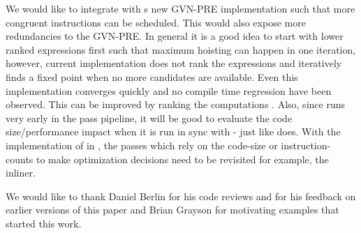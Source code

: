\documentclass[sigplan,10pt,review,anonymous]{acmart}\settopmatter{printfolios=true,printccs=false,printacmref=false}
\begin{document}
We would like to integrate \GCM{} with s new GVN-PRE implementation such
that more congruent instructions can be scheduled. This would also expose more
redundancies to the GVN-PRE. In general it is a good idea to start with lower
ranked expressions first such that maximum hoisting can happen in one iteration,
however, current implementation does not rank the expressions and iteratively
finds a fixed point when no more candidates are available. Even this
implementation converges quickly and no compile time regression have been
observed. This can be improved by ranking the computations
\cite{rosen1988global}. Also, since \GCM{} runs very early in the pass pipeline,
it will be good to evaluate the code size/performance impact when it is run in
sync with \GVN{}-\PRE{} just like \GCC{} does. With the implementation of \GCM{}
in \LLVM{}, the passes which rely on the code-size or instruction-counts to make
optimization decisions need to be revisited for example, the inliner.


\begin{acks}                            %
We would like to thank Daniel Berlin for his code reviews and for his feedback
on earlier versions of this paper and Brian Grayson for motivating examples that
started this work.
\end{acks}


%


\end{document}
